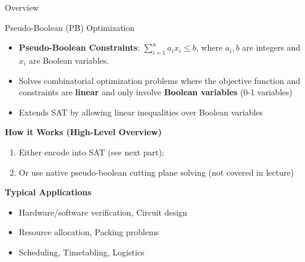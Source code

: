 \documentclass{cons-beamer}
\begin{document}
\begin{frame}{Overview}
\end{frame}


\begin{frame}{Pseudo-Boolean (PB) Optimization}
  \begin{itemize}
    \item \textbf{Pseudo-Boolean Constraints}: $\sum_{i=1}^n a_i x_i \leq b$, where $a_i, b$ are integers and $x_i$ are Boolean variables.
    \item Solves combinatorial optimization problems where the objective function and constraints are \textbf{linear} and only involve \textbf{Boolean variables} (0-1 variables)
    \item Extends SAT by allowing linear inequalities over Boolean variables
  \end{itemize}
  \vfill

  \textbf{How it Works (High-Level Overview)} $ $\\
  \begin{enumerate}
    \item Either encode into SAT (see next part);
    \item Or use native pseudo-boolean cutting plane solving (not covered in lecture)
  \end{enumerate}
  \vspace{0.4cm}

  \textbf{Typical Applications}
  \begin{itemize}
    \item Hardware/software verification, Circuit design
    \item Resource allocation, Packing problems
    \item Scheduling, Timetabling, Logistics
  \end{itemize}
\end{frame}
\end{document}
